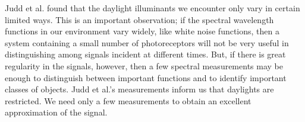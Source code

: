 Judd et al. found that the daylight illuminants
we encounter only vary in certain limited ways.
This is an important observation;
if the spectral wavelength functions in
our environment vary widely, like white noise functions,
then a system containing
a small number of photoreceptors will
not be very useful in distinguishing
among signals incident at different times.
But, if there is great regularity in the signals, however,
then a few spectral measurements
may be enough to distinguish between important
functions and to identify important classes of objects.
Judd et al.'s measurements inform us that
daylights are restricted.
We need only a few measurements to
obtain an excellent approximation of the signal.
